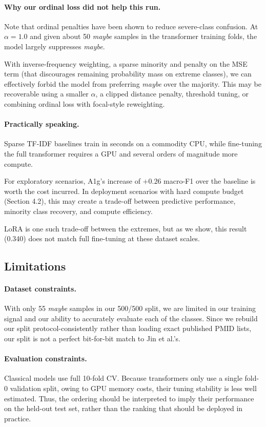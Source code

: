 \documentclass[11pt]{article}
\begin{document}
\paragraph{Why our ordinal loss did not help this run.} Note that ordinal penalties have been shown to reduce severe-class confusion. At $\alpha{=}1.0$ and given about 50 \textit{maybe} samples in the transformer training folds, the model largely suppresses \textit{maybe}.

With inverse-frequency weighting, a sparse minority and penalty on the MSE term (that discourages remaining probability mass on extreme classes), we can effectively forbid the model from preferring \textit{maybe} over the majority. This may be recoverable using a smaller $\alpha$, a clipped distance penalty, threshold tuning, or combining ordinal loss with focal-style reweighting.

\paragraph{Practically speaking.} Sparse TF-IDF baselines train in seconds on a commodity CPU, while fine-tuning the full transformer requires a GPU and several orders of magnitude more compute.

For exploratory scenarios, A1g's increase of $+0.26$ macro-F1 over the baseline is worth the cost incurred. In deployment scenarios with hard compute budget (Section 4.2), this may create a trade-off between predictive performance, minority class recovery, and compute efficiency.

LoRA is one such trade-off between the extremes, but as we show, this result (0.340) does not match full fine-tuning at these dataset scales.

\subsection{Limitations}

\paragraph{Dataset constraints.} With only 55 \textit{maybe} samples in our 500/500 split, we are limited in our training signal and our ability to accurately evaluate each of the classes. Since we rebuild our split protocol-consistently rather than loading exact published PMID lists, our split is not a perfect bit-for-bit match to Jin et al.'s.

\paragraph{Evaluation constraints.} Classical models use full 10-fold CV. Because transformers only use a single fold-0 validation split, owing to GPU memory costs, their tuning stability is less well estimated. Thus, the ordering should be interpreted to imply their performance on the held-out test set, rather than the ranking that should be deployed in practice.
\end{document}
